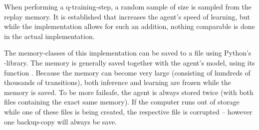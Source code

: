 When performing a q-training-step, a random sample of size  is sampled from the replay memory. It is established that \cite{schaul_prioritized_2015} increases the agent's speed of learning, but while the implementation allows for such an addition, nothing comparable is done in the actual implementation. 

The memory-classes of this implementation can be saved to a file using Python's -library. The memory is generally saved together with the agent's model, using its function . Because the memory can become very large (consisting of hundreds of thousands of transitions), both inference and learning are frozen while the memory is saved. To be more failsafe, the agent is always stored twice (with both files containing the exact same memory). If the computer runs out of storage while one of these files is being created, the respective file is corrupted -- however one backup-copy will always be save.

